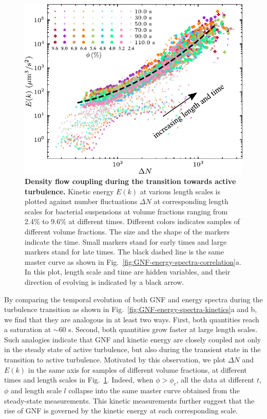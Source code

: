 \begin{figure}[!ht]
\begin{center}
\includegraphics[width=4.5in]{figs/5-GNF/9.pdf}
\caption[Density Flow Coupling during the Transition towards Active Turbulence]
{
\textbf{Density flow coupling during the transition towards active turbulence.}
Kinetic energy $E(k)$ at various length scales is plotted against number fluctuations $\Delta N$ at corresponding length scales for bacterial suspensions at volume fractions ranging from 2.4\% to 9.6\% at different times. Different colors indicates samples of different volume fractions. The size and the shape of the markers indicate the time. Small markers stand for early times and large markers stand for late times. The black dashed line is the same master curve as shown in Fig.~\ref{fig:GNF-energy-spectra-correlation}a. In this plot, length scale and time are hidden variables, and their direction of evolving is indicated by a black arrow.
}
\label{fig:GNF-energy-spectra-correlation-transient}
\end{center}
\end{figure}

By comparing the temporal evolution of both GNF and energy spectra during the turbulence transition as shown in Fig.~\ref{fig:GNF-energy-spectra-kinetics}a and b, we find that they are analogous in at least two ways. First, both quantities reach a saturation at $\sim 60$ s. Second, both quantities grow faster at large length scales. Such analogies indicate that GNF and kinetic energy are  closely coupled not only in the steady state of active turbulence, but also during the transient state in the transition to active turbulence.
Motivated by this observation, we plot $\Delta N$ and $E(k)$ in the same axis for samples of different volume fractions, at different times and length scales in Fig.~\ref{fig:GNF-energy-spectra-correlation-transient}. Indeed, when $\phi>\phi_c$, all the data at different $t$, $\phi$ and length scale $l$ collapse into the same master curve obtained from the steady-state measurements. This kinetic measurements further suggest that the rise of GNF is governed by the kinetic energy at each corresponding scale.



